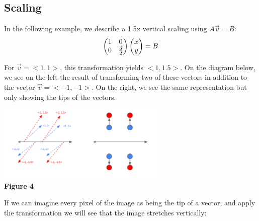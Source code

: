 \documentclass{article}
\begin{document}
\subsection{Scaling}
\par \noindent In the following example, we describe a 1.5x vertical scaling using \(A\vec{v} = B\):
\[
\left(\begin{array}{@{}cc@{}}
	1 & 0 \\
	0 & \frac{3}{2} \\
\end{array}\right)
\left(\begin{array}{@{}c@{}}
	x \\
	y \\
\end{array}\right)= B
\]
\par \noindent For \( \vec v = <1,1>\), this transformation yields \(<1,1.5>\). On the diagram below, we see on the left the result of transforming two of these vectors in addition to the vector \(\vec v=<-1,-1>\). On the right, we see the same representation but only showing the tips of the vectors.

\begin{center}
	\includegraphics[width=8cm]{scale.png}\\
	\textbf{Figure 4}
\end{center}

\par\noindent If we can imagine every pixel of the image as being the tip of a vector, and apply the transformation we will see that the image stretches vertically:
\end{document}
